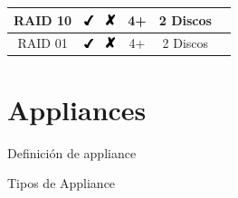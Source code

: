 \begin{table}[H]
{\begin{tabular}[c]{c|c|c|c|c|p{5.95cm}}
\hline
RAID 10 & \includegraphics[keepaspectratio=true, width=10px]{figures/Y} & \includegraphics[keepaspectratio=true, width=10px]{figures/N} & 4+ & 2 Discos &  \\
\hline
RAID 01 & \includegraphics[keepaspectratio=true, width=10px]{figures/Y} & \includegraphics[keepaspectratio=true, width=10px]{figures/N} & 4+ & 2 Discos &  \\
\end{tabular}
} %
\end{table}

    \section {Appliances}

Definici\'{o}n de appliance \cite{74e586f4d341588a0bcc6273c524d8f5}

Tipos de Appliance

